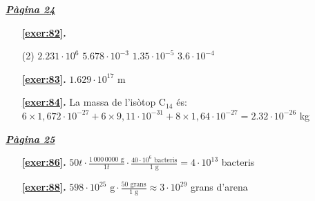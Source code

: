  \vspace{1cm} 
 

\vspace{0.3cm}


\hyperlink{page.24}{\textbf{\em Pàgina 24}}
\begin{enumerate}



 \item[\fontfamily{phv}\selectfont\color{blue}\textbf{\ref{exer:82}. }] \label{ans:82}
 \begin{tasks}[column-sep=1em, item-indent=1.3333em](2)
	 \task $2.231\cdot 10^6$
	 \task $5.678\cdot 10^{-3}$
	 \task $1.35\cdot 10^{-5}$
	 \task $3.6\cdot 10^{-4}$
\end{tasks}
 \end{enumerate}
\begin{enumerate}
\item[\fontfamily{phv}\selectfont\color{blue}\textbf{\ref{exer:83}. }] \label{ans:83} 
$1.629\cdot 10^{17}$ m
\item[\fontfamily{phv}\selectfont\color{blue}\textbf{\ref{exer:84}. }] \label{ans:84} 
La massa de l'isòtop C${}_{14}$ és: $6\times 1,672 \cdot 10^{-27} + 6 \times 9,11 \cdot 10^{-31}+ 8\times 1,64 \cdot 10^{-27} = 2.32\cdot 10^{-26}$ kg
 \end{enumerate}
\vspace{0.3cm}


\hyperlink{page.25}{\textbf{\em Pàgina 25}}
\begin{enumerate}
\item[\fontfamily{phv}\selectfont\color{blue}\textbf{\ref{exer:86}. }] \label{ans:86} 
$50 t \cdot \frac {1\,000\,0000 \text { g}}{1 t} \cdot \frac {40\cdot 10^6 \text { bacteris}}{1 \text { g}}=4\cdot 10^{13}$ bacteris
 \end{enumerate}
\begin{enumerate}
\item[\fontfamily{phv}\selectfont\color{blue}\textbf{\ref{exer:88}. }] \label{ans:88} 
$ 598 \cdot 10^{25} \text { g} \cdot \frac {50 \text { grans}}{1 \text { g}} \approx 3\cdot 10^{29}$ grans d'arena
 \end{enumerate}
\vspace{0.3cm}

